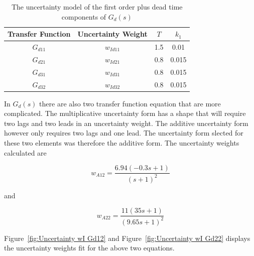 \begin{table}[H]
	\centering
	\begin{tabular}{cccc}
		\hline
		\textbf{Transfer Function} & \textbf{Uncertainty Weight} & \textbf{$T$} & \textbf{$k_1$} \\
		\hline
		$G_{d11}$                        & $w_{Id11}$                  & 1.5        & 0.01        \\
		$G_{d21}$                        & $w_{Id21}$                  & 0.8        & 0.015        \\
		$G_{d31}$                        & $w_{Id31}$                  & 0.8       & 0.015        \\
		$G_{d32}$                        & $w_{Id 32}$                 & 0.8       & 0.015       \\\hline 
	\end{tabular}
	\caption{The uncertainty model of the first order plus dead time components of $G_d(s)$}
	\label{tab:Uncertainty description Gd(s)}
\end{table}

In $G_d(s)$ there are also two transfer function equation that are more complicated. The multiplicative uncertainty form has a shape that will require two lags and two leads in an uncertainty weight. The additive uncertainty form however only requires two lags and one lead. The uncertainty form slected for these two elements was therefore the additive form. The uncertainty weights calculated are

\begin{equation}
	w_{A12} = \frac{6.94(-0.3s+1)}{(s+1)^2}
\end{equation}

and 

\begin{equation}
w_{A22} = \frac{11(35s+1)}{(9.65s+1)^2}
\end{equation}

Figure~\ref{fig:Uncertainty wI Gd12} and Figure~\ref{fig:Uncertainty wI Gd22} displays the uncertainty weights fit for the above two equations.

